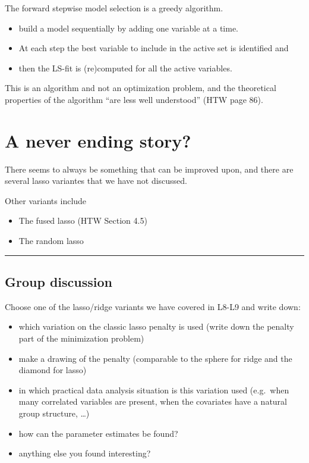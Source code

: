 \documentclass[
  letterpaper,
  DIV=11,
  numbers=noendperiod]{scrartcl}
\providecommand{\tightlist}{%
  \setlength{\itemsep}{0pt}\setlength{\parskip}{0pt}}\usepackage{longtable,booktabs,array}
\begin{document}
The forward stepwise model selection is a greedy algorithm.

\begin{itemize}
\tightlist
\item
  build a model sequentially by adding one variable at a time.
\item
  At each step the best variable to include in the active set is
  identified and
\item
  then the LS-fit is (re)computed for all the active variables.
\end{itemize}

This is an algorithm and not an optimization problem, and the
theoretical properties of the algorithm ``are less well understood''
(HTW page 86).

\hypertarget{a-never-ending-story}{%
\section{A never ending story?}\label{a-never-ending-story}}

There seems to always be something that can be improved upon, and there
are several lasso variantes that we have not discussed.

Other variants include

\begin{itemize}
\tightlist
\item
  The fused lasso (HTW Section 4.5)
\item
  The random lasso
\end{itemize}

\begin{center}\rule{0.5\linewidth}{0.5pt}\end{center}

\hypertarget{group-discussion}{%
\subsection{Group discussion}\label{group-discussion}}

Choose one of the lasso/ridge variants we have covered in L8-L9 and
write down:

\begin{itemize}
\tightlist
\item
  which variation on the classic lasso penalty is used (write down the
  penalty part of the minimization problem)
\item
  make a drawing of the penalty (comparable to the sphere for ridge and
  the diamond for lasso)
\item
  in which practical data analysis situation is this variation used
  (e.g.~when many correlated variables are present, when the covariates
  have a natural group structure, \ldots)
\item
  how can the parameter estimates be found?
\item
  anything else you found interesting?
\end{itemize}
\end{document}
